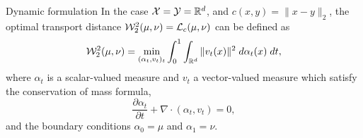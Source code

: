 \begin{frame}{Dynamic formulation}
    \footnotesize
    In the case $\mathcal{X} = \mathcal{Y} = \mathbb{R}^d$, and $c(x, y) = \|x - y\|_2$, 
    the optimal transport distance $\mathcal{W}_2^2(\mu, \nu) = \mathcal{L}_c(\mu,\nu)$
    can be defined as
    \begin{equation}
        \mathcal{W}_2^2(\mu,\nu) = \min_{(\alpha_t,v_t)_t} \int_0^1 \int_{\mathbb{R}^d}
        \| v_t(x) \|^2 \;d\alpha_t(x)\;dt,
    \end{equation}
    where $\alpha_t$ is a scalar-valued measure and $v_t$ a vector-valued measure
    which satisfy the conservation of mass formula,
    \begin{equation}
        \frac{\partial \alpha_t}{\partial t} + \nabla\cdot(\alpha_t,v_t) = 0,
    \end{equation}
    and the boundary conditions $\alpha_0=\mu$ and $\alpha_1=\nu$.
\end{frame}